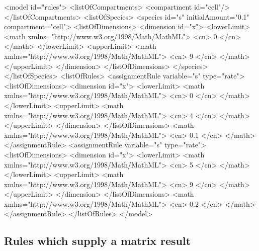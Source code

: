 \documentclass{cekarticle}
\begin{document}
\begin{example}
<model id="rules">
    <listOfCompartments>
        <compartment id="cell"/>
    </listOfCompartments>
    <listOfSpecies>
        <species id="s" initialAmount="0.1" compartment="cell">
            <listOfDimensions>
                <dimension id="x">
                    <lowerLimit>
                        <math xmlns="http://www.w3.org/1998/Math/MathML">
                            <cn> 0 </cn>
                        </math>
                    </lowerLimit>
                    <upperLimit>
                        <math xmlns="http://www.w3.org/1998/Math/MathML">
                            <cn> 9 </cn>
                        </math>
                    </upperLimit>
                </dimension>
            </listOfDimensions>
        </species>
    </listOfSpecies>
    <listOfRules>
        <assignmentRule variable="s" type="rate">
            <listOfDimensions>
                <dimension id="x">
                    <lowerLimit>
                        <math xmlns="http://www.w3.org/1998/Math/MathML">
                            <cn> 0 </cn>
                        </math>
                    </lowerLimit>
                    <upperLimit>
                        <math xmlns="http://www.w3.org/1998/Math/MathML">
                            <cn> 4 </cn>
                        </math>
                    </upperLimit>
                </dimension>
            </listOfDimensions>
            <math xmlns="http://www.w3.org/1998/Math/MathML">
                <cn> 0.1 </cn>
            </math>
        </assignmentRule>
        <assignmentRule variable="s" type="rate">
            <listOfDimensions>
                <dimension id="x">
                    <lowerLimit>
                        <math xmlns="http://www.w3.org/1998/Math/MathML">
                            <cn> 5 </cn>
                        </math>
                    </lowerLimit>
                    <upperLimit>
                        <math xmlns="http://www.w3.org/1998/Math/MathML">
                            <cn> 9 </cn>
                        </math>
                    </upperLimit>
                </dimension>
            </listOfDimensions>
            <math xmlns="http://www.w3.org/1998/Math/MathML">
                <cn> 0.2 </cn>
            </math>
        </assignmentRule>
    </listOfRules>
</model>
\end{example}

\subsection{Rules which supply a matrix result}
\end{document}
